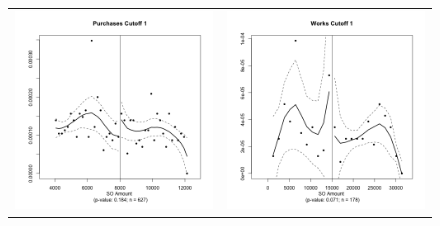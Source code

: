 \documentclass[11pt]{article}
\begin{document}
\begin{figure}[!htbp]
  \begin{tabular}{cc}
  \includegraphics[scale=.41]{purchasesmanipulation1} & \includegraphics[scale=.41]{worksmanipulation1} \\

\end{tabular}
\end{figure}
\end{document}
